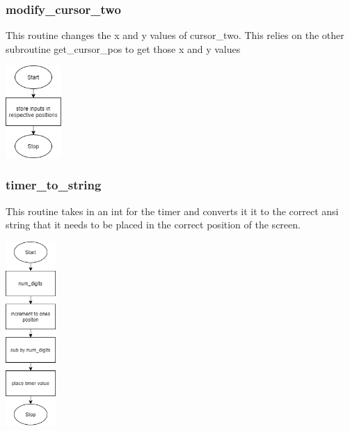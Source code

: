 \documentclass{article}
\begin{document}
    \subsubsection{modify\_cursor\_two}
        This routine changes the x and y values of cursor\_two. This relies on
        the other subroutine get\_cursor\_pos to get those x and y values
        \begin{center}
            {\includegraphics[height=3.5cm]{modify_cursor_two.png}\centering} 
        \end{center}
        
    \subsubsection{timer\_to\_string}
        This routine takes in an int for the timer and converts it it to 
        the correct ansi string that it needs to be placed in the correct position
        of the screen.
        \begin{center}
            {\includegraphics[height=7cm]{timer_to_string.png}\centering} 
        \end{center}
        \newpage
\end{document}
